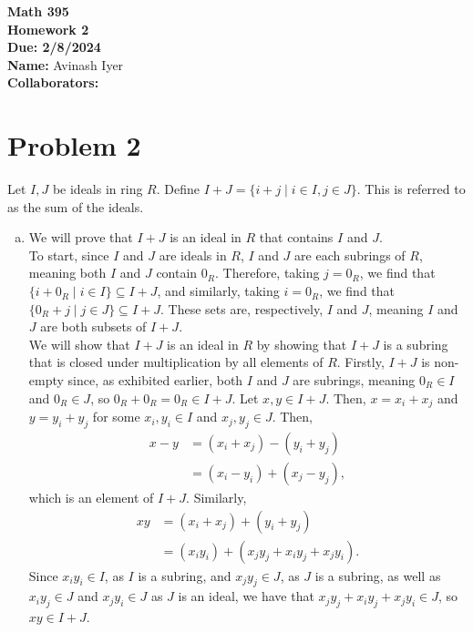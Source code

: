 \documentclass[10pt]{extarticle}
\title{}
\author{}
\date{}
\begin{document}
  \begin{center}
    {\bf \Large Math 395 \\[0.1in]Homework 2 \\[0.1in]
    Due: 2/8/2024}\\[.25in]
    {\bf Name:} {Avinash Iyer}\\[0.15in]
    {\bf Collaborators:} {} \\
  \end{center}
  \section{Problem 2}%
  Let $I,J$ be ideals in ring $R$. Define $I+J = \{i+j\mid i\in I,j\in J\}$. This is referred to as the sum of the ideals.
  \begin{enumerate}[(a)]
    \item We will prove that $I + J$ is an ideal in $R$ that contains $I$ and $J$.\\

      To start, since $I$ and $J$ are ideals in $R$, $I$ and $J$ are each subrings of $R$, meaning both $I$ and $J$ contain $0_R$. Therefore, taking $j = 0_R$, we find that $\{i + 0_R\mid i\in I\}\subseteq I+J$, and similarly, taking $i = 0_R$, we find that $\{0_R + j\mid j\in J\}\subseteq I+J $. These sets are, respectively, $I$ and $J$, meaning $I$ and $J$ are both subsets of $I+J$.\\

      We will show that $I+J$ is an ideal in $R$ by showing that $I+J$ is a subring that is closed under multiplication by all elements of $R$. Firstly, $I+J$ is non-empty since, as exhibited earlier, both $I$ and $J$ are subrings, meaning $0_R\in I$ and $0_R\in J$, so $0_R + 0_R = 0_R\in I+J$. Let $x,y\in I+J$. Then, $x = x_i + x_j$ and $y = y_i + y_j$ for some $x_i,y_i\in I$ and $x_j,y_j\in J$. Then,
      \begin{align*}
        x-y &= (x_i + x_j) - (y_i + y_j)\\
            &= (x_i - y_i) + (x_j - y_j),
      \end{align*}
      which is an element of $I + J$. Similarly, 
      \begin{align*}
        xy &= (x_i + x_j) + (y_i + y_j)\\
           &= (x_iy_i) + (x_jy_j + x_iy_j + x_jy_i).
      \end{align*}
      Since $x_iy_i\in I$, as $I$ is a subring, and $x_jy_j\in J$, as $J$ is a subring, as well as $x_iy_j\in J$ and $x_jy_i\in J$ as $J$ is an ideal, we have that $x_jy_j + x_iy_j + x_jy_i\in J$, so $xy\in I+J$.\\


\end{enumerate}
\end{document}
